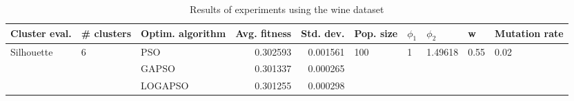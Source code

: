\begin{table}
\centering
\caption{Results of experiments using the wine dataset}
\begin{tabular}{lllrrlllll}
\toprule
              Cluster eval. &        \# clusters & Optim. algorithm &  Avg. fitness &  Std. dev. &            Pop. size &         $\phi_{1}$ &               $\phi_{2}$ &                     w &         Mutation rate \\
\midrule
\multirow{3}{*}{Silhouette} & \multirow{3}{*}{6} &              PSO &      0.302593 &   0.001561 & \multirow{3}{*}{100} & \multirow{3}{*}{1} & \multirow{3}{*}{1.49618} & \multirow{3}{*}{0.55} & \multirow{3}{*}{0.02} \\
                            &                    &            GAPSO &      0.301337 &   0.000265 &                      &                    &                          &                       &                       \\
                            &                    &          LOGAPSO &      0.301255 &   0.000298 &                      &                    &                          &                       &                       \\
\bottomrule
\end{tabular}
\end{table}
